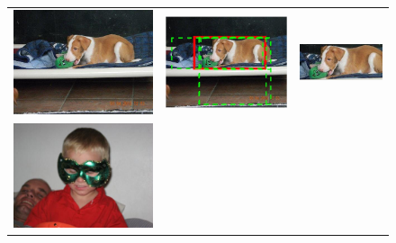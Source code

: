 \setlength{\tabcolsep}{0.5pt}
\begin{figure}[htb]
\begin{center}
\begin{tabular}{ccc}
\includegraphics[width=0.31\linewidth,height=0.31\linewidth]{figs/re-classification/ILSVRC2012_val_00000115} &
\includegraphics[width=0.31\linewidth,height=0.31\linewidth]{figs/re-classification/boundingbox/ILSVRC2012_val_00000115} &
\includegraphics[width=0.31\linewidth,height=0.31\linewidth]{figs/re-classification/crop_image/ILSVRC2012_val_00000115} \\
\includegraphics[width=0.31\linewidth,height=0.31\linewidth]{figs/re-classification/ILSVRC2012_val_00000608} &

\end{tabular}
\end{center}
\end{figure}
